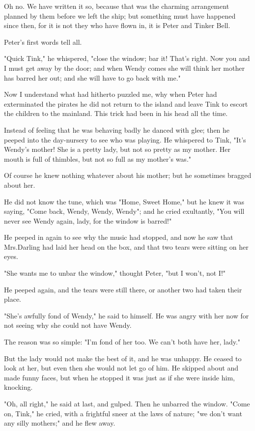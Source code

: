 Oh no.
We have written it so, because that was the charming arrangement planned by them before we left the ship;
but something must have happened since then,
for it is not they who have flown in, it is Peter and Tinker Bell.

Peter's first words tell all.

"Quick Tink," he whispered, "close the window;
bar it!
That's right.
Now you and I must get away by the door;
and when Wendy comes she will think her mother has barred her out;
and she will have to go back with me."

Now I understand what had hitherto puzzled me,
why when Peter had exterminated the pirates
he did not return to the island and leave Tink to escort the children to the mainland.
This trick had been in his head all the time.

Instead of feeling that he was behaving badly he danced with glee;
then he peeped into the day-nursery to see who was playing.
He whispered to Tink, "It's Wendy's mother!
She is a pretty lady, but not so pretty as my mother.
Her mouth is full of thimbles, but not so full as my mother's was."

Of course he knew nothing whatever about his mother;
but he sometimes bragged about her.

He did not know the tune,
which was "Home, Sweet Home,"
but he knew it was saying, "Come back, Wendy, Wendy, Wendy";
and he cried exultantly,
"You will never see Wendy again, lady, for the window is barred!"

He peeped in again to see why the music had stopped,
and now he saw that Mrs.\@ Darling had laid her head on the box,
and that two tears were sitting on her eyes.

"She wants me to unbar the window," thought Peter,
"but I won't, not I\@!"

He peeped again, and the tears were still there, or another two had taken their place.

"She's awfully fond of Wendy," he said to himself.
He was angry with her now for not seeing why she could not have Wendy.

The reason was so simple:
"I'm fond of her too.
We can't both have her, lady."

But the lady would not make the best of it, and he was unhappy.
He ceased to look at her, but even then she would not let go of him.
He skipped about and made funny faces,
but when he stopped it was just as if she were inside him, knocking.

"Oh, all right," he said at last, and gulped.
Then he unbarred the window.
"Come on, Tink," he cried, with a frightful sneer at the laws of nature;
"we don't want any silly mothers;" and he flew away.

